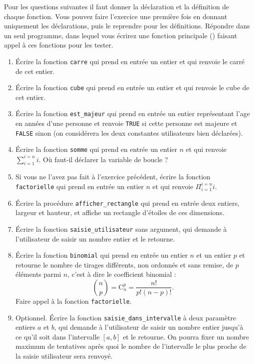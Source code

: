 Pour les questions suivantes il faut donner la déclaration et la
définition de chaque fonction. Vous pouvez faire l'exercice une
première fois en donnant uniquement les déclarations, puis le
reprendre pour les définitions. Répondre dans un seul programme, dans
lequel vous écrirez une fonction principale () faisant appel à
ces fonctions pour les tester.
\begin{enumerate}
\item Écrire la fonction \verb|carre| qui prend en entrée un entier et qui renvoie le carré de cet entier.
\item Écrire la fonction \verb|cube| qui prend en entrée un entier et qui renvoie le cube de cet entier.
\item Écrire la fonction \verb|est_majeur| qui prend en entrée un entier représentant l'age en années d'une personne et renvoie \verb|TRUE| si cette personne est majeure et \verb|FALSE| sinon (on considérera les deux constantes utilisateurs bien déclarées).
\item Écrire la fonction \verb|somme| qui prend en entrée un entier
  $n$ et qui renvoie $\sum_{i=1}^{i=n} i$. Où faut-il déclarer la
  variable de boucle ?
\item Si vous ne l'avez pas fait à l'exercice précédent, écrire la fonction \verb|factorielle| qui prend en entrée un entier
  $n$ et qui renvoie $\Pi_{i=1}^{i=n} i$. 
\item Écrire la procédure \verb|afficher_rectangle| qui prend en
  entrée deux entiers, largeur et hauteur, et affiche un rectangle
  d'étoiles de ces dimensions.
\item Écrire la fonction \verb|saisie_utilisateur| sans argument, qui demande à l'utilisateur de saisir un nombre entier et le
  retourne.
\item Écrire la fonction \verb|binomial| qui prend en entrée un entier
  $n$ et un entier $p$ et retourne le nombre de tirages différents,
  non ordonnés et sans remise, de $p$ éléments parmi $n$, c'est à dire
  le coefficient binomial :
\[
\binom{n}{p} = \text{C}^p_n = \frac{n!}{p!(n-p)!}.
\]
Faire appel à la fonction \verb|factorielle|.
\item Optionnel. Écrire la fonction \verb|saisie_dans_intervalle| à deux
  paramètre entiers $a$ et $b$, qui demande à l'utilisateur de saisir
  un nombre entier jusqu'à ce qu'il soit dans l'intervalle $[a, b]$ et le
  retourne. On pourra fixer un nombre maximum de tentatives après quoi
  le nombre de l'intervalle le plus proche de la saisie utilisateur
  sera renvoyé.
\end{enumerate}

